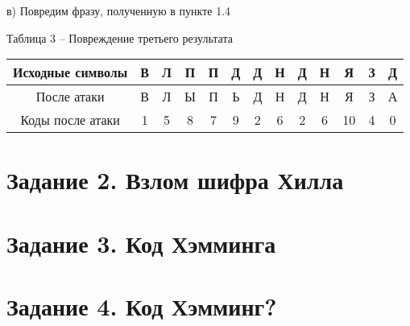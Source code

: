 \documentclass[a5paper, 10pt]{article}
\theoremstyle{definition}
\theoremstyle{plain}
\theoremstyle{remark}
\begin{document}
 в) Повредим фразу, полученную в пункте 1.4
\begin{center}
Таблица 3 -- Повреждение третьего результата\\
\begin{tabular}{ |c|c|c|c|c|c|c|c|c|c|c|c|c| } 
 \hline
Исходные символы & В & Л & П & П & Д  & Д & Н  & Д & Н  & Я & З  & Д\\
\hline
После атаки  & В & Л & Ы & П & Ь  & Д & Н  & Д & Н  & Я & З  & А \\
 \hline
Коды после атаки & 1 & 5 & 8 & 7 & 9  & 2 & 6  & 2 & 6  & 10 & 4  & 0  \\
 \hline
\end{tabular}
\end{center}

\section{Задание 2. Взлом шифра Хилла}	

\section{Задание 3. Код Хэмминга}

\section{Задание 4. Код Хэмминг?}
\end{document}

